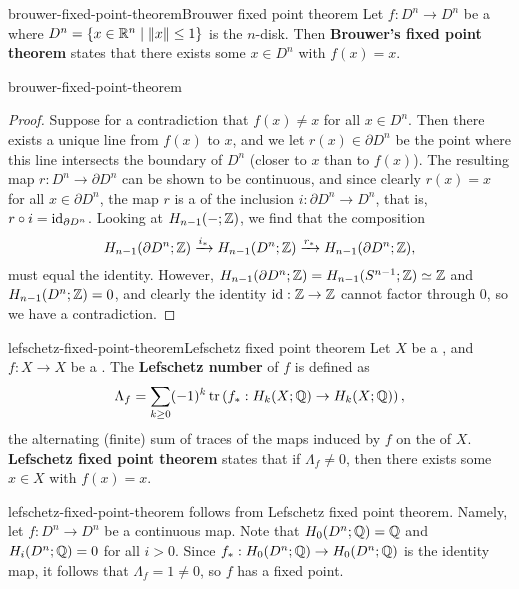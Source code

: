 \begin{topic}{brouwer-fixed-point-theorem}{Brouwer fixed point theorem}
    Let $f : D^n \to D^n$ be a  where $D^n = \{ x \in \mathbb{R}^n \mid \left\|x\right\| \le 1 \}$ is the $n$-disk. Then \textbf{Brouwer's fixed point theorem} states that there exists some $x \in D^n$ with $f(x) = x$.
\end{topic}

\begin{example}{brouwer-fixed-point-theorem}
    \begin{proof}
        Suppose for a contradiction that $f(x) \ne x$ for all $x \in D^n$. Then there exists a unique line from $f(x)$ to $x$, and we let $r(x) \in \partial D^n$ be the point where this line intersects the boundary of $D^n$ (closer to $x$ than to $f(x)$). The resulting map $r : D^n \to \partial D^n$ can be shown to be continuous, and since clearly $r(x) = x$ for all $x \in \partial D^n$, the map $r$ is a  of the inclusion $i : \partial D^n \to D^n$, that is, $r \circ i = \text{id}_{\partial D^n}$. Looking at  $H_{n - 1}(-; \mathbb{Z})$, we find that the composition
        \[ H_{n - 1}(\partial D^n; \mathbb{Z}) \xrightarrow{i_*} H_{n - 1}(D^n; \mathbb{Z}) \xrightarrow{r_*} H_{n - 1}(\partial D^n; \mathbb{Z}) , \]
        must equal the identity. However, $H_{n - 1}(\partial D^n; \mathbb{Z}) = H_{n - 1}(S^{n - 1}; \mathbb{Z}) \simeq \mathbb{Z}$ and $H_{n - 1}(D^n; \mathbb{Z}) = 0$, and clearly the identity $\text{id} : \mathbb{Z} \to \mathbb{Z}$ cannot factor through $0$, so we have a contradiction.
    \end{proof}
\end{example}

\begin{topic}{lefschetz-fixed-point-theorem}{Lefschetz fixed point theorem}
    Let $X$ be a , and $f : X \to X$ be a . The \textbf{Lefschetz number} of $f$ is defined as
    \[ \Lambda_f = \sum_{k \ge 0} (-1)^k \operatorname{tr} \left(f_* : H_k(X; \mathbb{Q}) \to H_k(X; \mathbb{Q}) \right) , \]
    the alternating (finite) sum of traces of the maps induced by $f$ on the  of $X$. \textbf{Lefschetz fixed point theorem} states that if $\Lambda_f \ne 0$, then there exists some $x \in X$ with $f(x) = x$.
\end{topic}

\begin{example}{lefschetz-fixed-point-theorem}
     follows from Lefschetz fixed point theorem. Namely, let $f : D^n \to D^n$ be a continuous map. Note that $H_0(D^n; \mathbb{Q}) = \mathbb{Q}$ and $H_i(D^n; \mathbb{Q}) = 0$ for all $i > 0$. Since $f_* : H_0(D^n; \mathbb{Q}) \to H_0(D^n; \mathbb{Q})$ is the identity map, it follows that $\Lambda_f = 1 \ne 0$, so $f$ has a fixed point.
\end{example}
